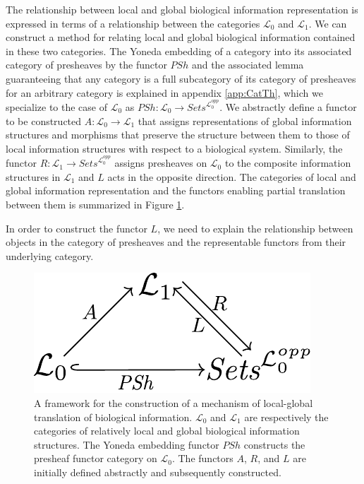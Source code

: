 \documentclass[aps,twocolumn]{revtex4-1}
\begin{document}

The relationship between local and global biological information representation is expressed in terms of a relationship between the categories $\mathcal{L}_0$ and $\mathcal{L}_1$. We can construct a method for relating local and global biological information contained in these two categories. The Yoneda embedding of a category into its associated category of presheaves by the functor $PSh$ and the associated lemma guaranteeing that any category is a full subcategory of its category of presheaves for an arbitrary category is explained in appendix \ref{app:CatTh}, which we specialize to the case of $\mathcal{L}_0$ as $PSh: \mathcal{L}_0 \rightarrow \textit{Sets}^{\mathcal{L}_0^{opp}}$. We abstractly define a functor to be constructed $A:\mathcal{L}_0 \rightarrow \mathcal{L}_1$ that assigns representations of global information structures and morphisms that preserve the structure between them to those of local information structures with respect to a biological system.  Similarly, the functor $R: \mathcal{L}_1 \rightarrow \textit{Sets}^{\mathcal{L}_0^{opp}}$ assigns presheaves on $\mathcal{L}_0$ to the composite information structures in $\mathcal{L}_1$ and $L$ acts in the opposite direction. The categories of local and global information representation and the functors enabling partial translation between them is summarized in Figure \ref{fig:ascent}.

In order to construct the functor $L$, we need to explain the relationship between objects in the category of presheaves and the representable functors from their underlying category.

\begin{figure}
\noindent\includegraphics[width=0.5\columnwidth]{fig/ascent.pdf}
\caption{A framework for the construction of a mechanism of local-global translation of biological information. $\mathcal{L}_0$ and $\mathcal{L}_1$ are respectively the categories of relatively local and global biological information structures. The Yoneda embedding functor $PSh$ constructs the presheaf functor category on $\mathcal{L}_0$. The functors $A$, $R$, and $L$ are initially defined abstractly and subsequently constructed.}
\label{fig:ascent}
\end{figure}
\end{document}
